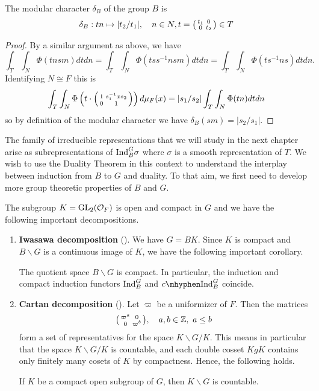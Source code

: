 \begin{prop}\label{prop:modularchar}
    The modular character $\delta_B$ of the group $B$ is
    $$\delta_B : tn \mapsto |t_2/t_1|, \quad n \in N, t = \begin{psmallmatrix}
        t_1 & 0 \\ 0 & t_2
    \end{psmallmatrix} \in T$$
\end{prop}
\begin{proof}
    By a similar argument as above, we have
    $$\int_T\int_N \Phi(tnsm) dtdn = \int_T\int_N \Phi(tss^{-1}nsm)dtdn = \int_T\int_N \Phi(ts^{-1}ns) dt dn.$$ Identifying $N \cong F$ this is
    $$\int_T\int_N \Phi\left(t \cdot \begin{psmallmatrix}
        1 & s_1^{-1}xs_2 \\0&1 
    \end{psmallmatrix}\right) d\mu_F(x) = |s_1/s_2|\int_T\int_N\Phi(tn)dtdn$$
    so by definition of the modular character we have $\delta_B(sm) = |s_2/s_1|$.
\end{proof}

The family of irreducible representations that we will study in the next chapter arise as subrepresentations of $\mathrm{Ind}_B^G\sigma$ where $\sigma$ is a smooth representation of $T$. We wish to use the Duality Theorem in this context to understand the interplay between induction from $B$ to $G$ and duality. To that aim, we first need to develop more group theoretic properties of $B$ and $G$. 

The subgroup $K=\mathrm{GL}_2(\mathcal{O}_F)$ is open and compact in $G$ and we have the following important decompositions.

\begin{enumerate}[(1)]
    \item \textbf{Iwasawa decomposition} (\cite[7.2.1]{BH1}). We have $G=BK$. Since $K$ is compact and $B\backslash G$ is a continuous image of $K$, we have the following important corollary.
    \begin{cor}\label{cor:BGcompact}
        The quotient space $B\backslash G$ is compact. In particular, the induction and compact induction functors $\mathrm{Ind}_B^G$ and $\cInd_B^G$ coincide.
    \end{cor}
    \item \textbf{Cartan decomposition} (\cite[7.2.2]{BH1}). Let $\varpi$ be a uniformizer of $F$. Then the matrices  
    $$\begin{psmallmatrix}
        \varpi^a & 0\\
        0 & \varpi^b\\
    \end{psmallmatrix},\quad a,b\in\mathbb{Z},\ a\leq b$$
    form a set of representatives for the space $K\backslash G/K$. This means in particular that the space $K\backslash G/K$ is countable, and each double cosset $KgK$ contains only finitely many cosets of $K$ by compactness. Hence, the following holds.
    \begin{cor}\label{cor:KGcount}
        If $K$ be a compact open subgroup of $G$, then $K\backslash G$ is countable.
    \end{cor}
\end{enumerate}

